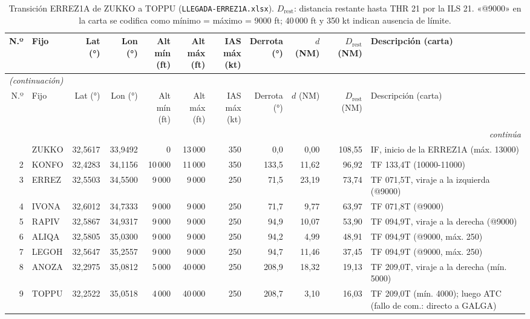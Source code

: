\begingroup\scriptsize\setlength{\tabcolsep}{2.8pt}
\begin{longtable}{rlrrrrrrrr>{\raggedright\arraybackslash}p{3.4cm}}
\caption{Transición ERREZ1A de ZUKKO a TOPPU (\texttt{LLEGADA-ERREZ1A.xlsx}). $D_{\mathrm{rest}}$: distancia restante hasta THR 21 por la ILS 21. «@9000» en la carta se codifica como mínimo = máximo = 9000 ft; 40\,000 ft y 350 kt indican ausencia de límite.}\label{tab:llegada}\\
\toprule
N.º & Fijo & Lat (°) & Lon (°) & \makecell{Alt mín\\(ft)} & \makecell{Alt máx\\(ft)} & \makecell{IAS máx\\(kt)} & \makecell{Derrota\\(°)} & \makecell{$d$\\(NM)} & \makecell{$D_{\mathrm{rest}}$\\(NM)} & Descripción (carta)\\
\midrule
\endfirsthead
\multicolumn{11}{l}{\small\itshape (continuación)}\\
\toprule
N.º & Fijo & Lat (°) & Lon (°) & \makecell{Alt mín\\(ft)} & \makecell{Alt máx\\(ft)} & \makecell{IAS máx\\(kt)} & \makecell{Derrota\\(°)} & \makecell{$d$\\(NM)} & \makecell{$D_{\mathrm{rest}}$\\(NM)} & Descripción (carta)\\
\midrule
\endhead
\midrule
\multicolumn{11}{r}{\small\itshape continúa}\\
\endfoot
\bottomrule
\endlastfoot
1 & ZUKKO & 32,5617 & 33,9492 & 0 & 13\,000 & 350 & 0,0 & 0,00 & 108,55 & \scriptsize IF, inicio de la ERREZ1A (máx. 13000)\\
2 & KONFO & 32,4283 & 34,1156 & 10\,000 & 11\,000 & 350 & 133,5 & 11,62 & 96,92 & \scriptsize TF 133,4T (10000-11000)\\
3 & ERREZ & 32,5503 & 34,5500 & 9\,000 & 9\,000 & 250 & 71,5 & 23,19 & 73,74 & \scriptsize TF 071,5T, viraje a la izquierda (@9000)\\
4 & IVONA & 32,6012 & 34,7333 & 9\,000 & 9\,000 & 250 & 71,7 & 9,77 & 63,97 & \scriptsize TF 071,8T (@9000)\\
5 & RAPIV & 32,5867 & 34,9317 & 9\,000 & 9\,000 & 250 & 94,9 & 10,07 & 53,90 & \scriptsize TF 094,9T, viraje a la derecha (@9000)\\
6 & ALIQA & 32,5805 & 35,0300 & 9\,000 & 9\,000 & 250 & 94,2 & 4,99 & 48,91 & \scriptsize TF 094,9T (@9000, máx. 250)\\
7 & LEGOH & 32,5647 & 35,2557 & 9\,000 & 9\,000 & 250 & 94,7 & 11,46 & 37,45 & \scriptsize TF 094,9T (@9000, máx. 250)\\
8 & ANOZA & 32,2975 & 35,0812 & 5\,000 & 40\,000 & 250 & 208,9 & 18,32 & 19,13 & \scriptsize TF 209,0T, viraje a la derecha (mín. 5000)\\
9 & TOPPU & 32,2522 & 35,0518 & 4\,000 & 40\,000 & 250 & 208,7 & 3,10 & 16,03 & \scriptsize TF 209,0T (mín. 4000); luego ATC (fallo de com.: directo a GALGA)\\
\end{longtable}
\endgroup
